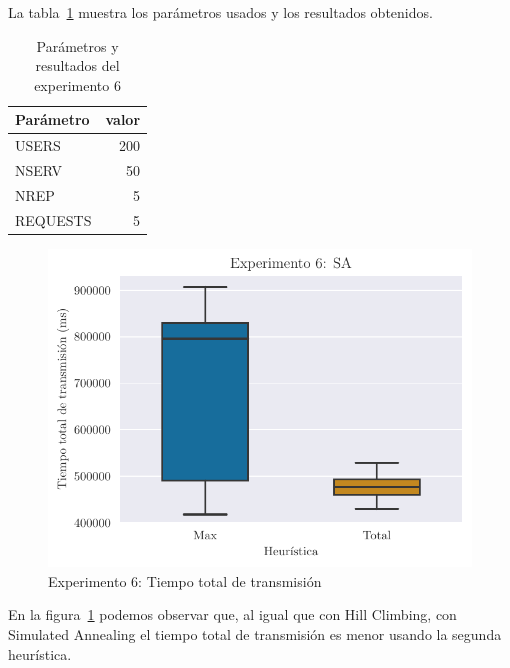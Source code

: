 La tabla~\ref{tab:ex6} muestra los parámetros usados y los resultados obtenidos.

\begin{table}[H]
    \caption{Parámetros y resultados del experimento 6}%
    \label{tab:ex6}
    \begin{center}
    \begin{tabular}{lr}
    \toprule
    Parámetro & valor \\
    \midrule
    USERS & 200 \\
    NSERV & 50 \\
    NREP & 5 \\
    REQUESTS & 5\\
    \bottomrule
    \end{tabular}
    \hspace{2em}
    
    \end{center}
\end{table}

\begin{figure}[H]
    \centering
    \includegraphics{include/plots/ex6fix_ttt_bplot.pdf}
    \caption{Experimento 6: Tiempo total de transmisión}%
    \label{fig:ex6ttt}
\end{figure}

En la figura~\ref{fig:ex6ttt} podemos observar que, al igual que con Hill Climbing, con Simulated Annealing
el tiempo total de transmisión es menor usando la segunda heurística.

